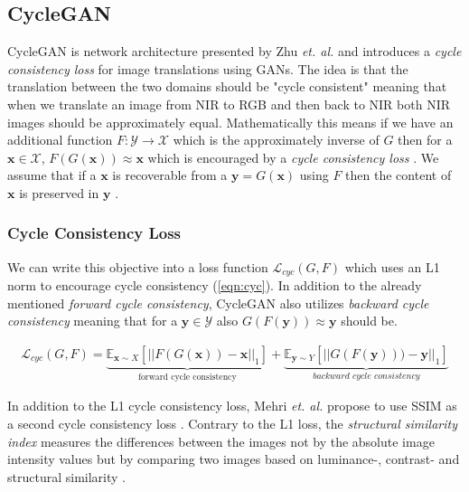 \documentclass[a4paper,11pt, DIV=12]{scrartcl}
\newcommand{\x}{\boldsymbol{x}}
\newcommand{\y}{\boldsymbol{y}}
\begin{document}
\subsection{CycleGAN}
CycleGAN is network architecture presented by Zhu \textit{et. al.} and introduces a \textit{cycle consistency loss} for image translations using GANs. 
The idea is that the translation between the two domains should be "cycle consistent" meaning that when we translate an image from NIR to RGB and then back 
to NIR both NIR images should be approximately equal. 
Mathematically this means if we have an additional function $F: \mathcal{Y} \to \mathcal{X}$ which is the approximately inverse of $G$ then for a $\x \in \mathcal{X}$, $F(G(\x)) \approx \x$
which is encouraged by a \textit{cycle consistency loss} \cite{cyclegan_orig}. We assume that if a $\x$ is recoverable from a $\y = G(\x)$ using $F$ then the content of $\x$
is preserved in $\y$ \cite{cyclegan_orig}.

\subsubsection*{Cycle Consistency Loss}
We can write this objective into a loss function $\mathcal{L}_{cyc}(G, F)$ which uses an L1 norm to encourage cycle consistency (\autoref{eqn:cyc}). 
In addition to the already mentioned \textit{forward cycle consistency}, CycleGAN also utilizes \textit{backward cycle consistency} meaning that for a $\y \in \mathcal{Y}$
also $G(F(\y)) \approx \y$ \cite{cyclegan_orig} should be.

\begin{equation}
   \label{eqn:cyc}
   \begin{aligned}
      \mathcal{L}_{cyc}(G, F) = \underbrace{\mathbb{E}_{\x \sim X}\left[||F(G(\x)) - \x||_1\right]}_{\text{forward cycle consistency}} + 
      \underbrace{\mathbb{E}_{\y \sim Y}\left[||G(F(\y))) - \y||_1\right]}_{\textit{backward cycle consistency}}
   \end{aligned}
\end{equation}

In addition to the L1 cycle consistency loss, Mehri \textit{et. al.} propose to use SSIM as a second cycle consistency loss \cite{mehri2019colorizing}. 
Contrary to the L1 loss, the \textit{structural similarity index} measures the differences between the images not by the absolute image intensity values but
by comparing two images based on luminance-, contrast- and structural similarity \cite{ssim}. 
\end{document}
